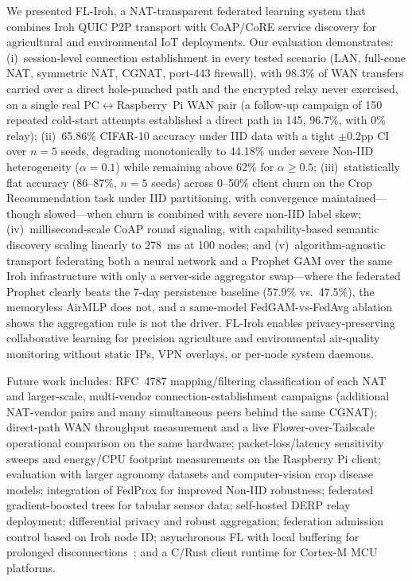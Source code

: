 ﻿\documentclass[journal]{IEEEtran}
\begin{document}
We presented FL-Iroh, a NAT-transparent federated learning system that combines Iroh QUIC P2P transport with CoAP/CoRE service discovery for agricultural and environmental IoT deployments. Our evaluation demonstrates: (i)~session-level connection establishment in every tested scenario (LAN, full-cone NAT, symmetric NAT, CGNAT, port-443 firewall), with 98.3\% of WAN transfers carried over a direct hole-punched path and the encrypted relay never exercised, on a single real PC$\leftrightarrow$Raspberry~Pi WAN pair (a follow-up campaign of 150 repeated cold-start attempts established a direct path in 145, 96.7\%, with 0\% relay); (ii)~65.86\% CIFAR-10 accuracy under IID data with a tight $\pm$0.2pp CI over $n{=}5$ seeds, degrading monotonically to 44.18\% under severe Non-IID heterogeneity ($\alpha{=}0.1$) while remaining above 62\% for $\alpha{\geq}0.5$; (iii)~statistically flat accuracy (86--87\%, $n{=}5$ seeds) across 0--50\% client churn on the Crop Recommendation task under IID partitioning, with convergence maintained---though slowed---when churn is combined with severe non-IID label skew; (iv)~millisecond-scale CoAP round signaling, with capability-based semantic discovery scaling linearly to 278~ms at 100 nodes; and (v)~algorithm-agnostic transport federating both a neural network and a Prophet GAM over the same Iroh infrastructure with only a server-side aggregator swap---where the federated Prophet clearly beats the 7-day persistence baseline (57.9\% vs.\ 47.5\%), the memoryless AirMLP does not, and a same-model FedGAM-vs-FedAvg ablation shows the aggregation rule is not the driver. FL-Iroh enables privacy-preserving collaborative learning for precision agriculture and environmental air-quality monitoring without static IPs, VPN overlays, or per-node system daemons.

Future work includes: RFC~4787 mapping/filtering classification of each NAT and larger-scale, multi-vendor connection-establishment campaigns (additional NAT-vendor pairs and many simultaneous peers behind the same CGNAT); direct-path WAN throughput measurement and a live Flower-over-Tailscale operational comparison on the same hardware; packet-loss/latency sensitivity sweeps and energy/CPU footprint measurements on the Raspberry Pi client; evaluation with larger agronomy datasets and computer-vision crop disease models; integration of FedProx for improved Non-IID robustness; federated gradient-boosted trees for tabular sensor data; self-hosted DERP relay deployment; differential privacy and robust aggregation; federation admission control based on Iroh node ID; asynchronous FL with local buffering for prolonged disconnections~\cite{fedbuff2022}; and a C/Rust client runtime for Cortex-M MCU platforms.
\end{document}
